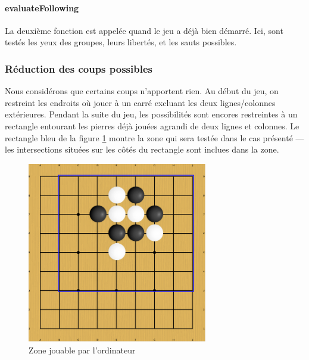 \documentclass[11pt,a4paper,titlepage,french]{article}
\begin{document}
				\paragraph{evaluateFollowing}
					La deuxième fonction est appelée quand le jeu a déjà bien démarré. Ici, sont testés les yeux des groupes, leurs libertés, et les sauts possibles.

			\subsubsection{Réduction des coups possibles}
				Nous considérons que certains coups n'apportent rien. Au début du jeu, on restreint les endroits où jouer à un carré excluant les deux lignes/colonnes extérieures. Pendant la suite du jeu, les possibilités  sont encores restreintes à un rectangle entourant les pierres déjà jouées agrandi de deux lignes et colonnes. Le rectangle bleu de la figure \ref{rectangletest} montre la zone qui sera testée dans le cas présenté --- les intersections situées sur les côtés du rectangle sont inclues dans la zone.

				\begin{figure}[hbt]
					\begin{center}
						\includegraphics[width=0.7\textwidth]{./rectangle-test.png}
					\end{center}
					\caption{Zone jouable par l'ordinateur}
					\label{rectangletest}
				\end{figure}
\end{document}
